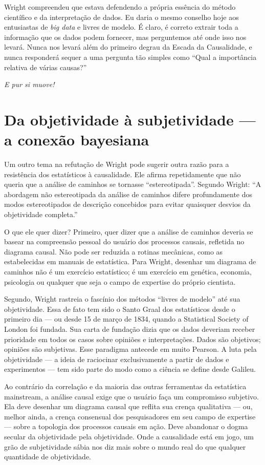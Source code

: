 \documentclass[11pt,a5paper,twoside]{book}
\begin{document}
Wright compreendeu que estava defendendo a própria essência do método científico e da interpretação de dados. Eu daria o mesmo conselho hoje aos entusiastas de \textit{big data} e livres de modelo. É claro, é correto extrair toda a informação que os dados podem fornecer, mas perguntemos até onde isso nos levará. Nunca nos levará além do primeiro degrau da Escada da Causalidade, e nunca responderá sequer a uma pergunta tão simples como “Qual a importância relativa de várias causas?”

\textit{E pur si muove!}

\section{Da objetividade à subjetividade — a conexão bayesiana}
Um outro tema na refutação de Wright pode sugerir outra razão para a resistência dos estatísticos à causalidade. Ele afirma repetidamente que não queria que a análise de caminhos se tornasse “estereotipada”. Segundo Wright: “A abordagem não estereotipada da análise de caminhos difere profundamente dos modos estereotipados de descrição concebidos para evitar quaisquer desvios da objetividade completa.”

O que ele quer dizer? Primeiro, quer dizer que a análise de caminhos deveria se basear na compreensão pessoal do usuário dos processos causais, refletida no diagrama causal. Não pode ser reduzida a rotinas mecânicas, como as estabelecidas em manuais de estatística. Para Wright, desenhar um diagrama de caminhos não é um exercício estatístico; é um exercício em genética, economia, psicologia ou qualquer que seja o campo de expertise do próprio cientista.

Segundo, Wright rastreia o fascínio dos métodos “livres de modelo” até sua objetividade. Essa de fato tem sido o Santo Graal dos estatísticos desde o primeiro dia — ou desde 15 de março de 1834, quando a Statistical Society of London foi fundada. Sua carta de fundação dizia que os dados deveriam receber prioridade em todos os casos sobre opiniões e interpretações. Dados são objetivos; opiniões são subjetivas. Esse paradigma antecede em muito Pearson. A luta pela objetividade — a ideia de raciocinar exclusivamente a partir de dados e experimentos — tem sido parte do modo como a ciência se define desde Galileu.

Ao contrário da correlação e da maioria das outras ferramentas da estatística mainstream, a análise causal exige que o usuário faça um compromisso subjetivo. Ela deve desenhar um diagrama causal que reflita sua crença qualitativa — ou, melhor ainda, a crença consensual dos pesquisadores em seu campo de expertise — sobre a topologia dos processos causais em ação. Deve abandonar o dogma secular da objetividade pela objetividade. Onde a causalidade está em jogo, um grão de subjetividade sábia nos diz mais sobre o mundo real do que qualquer quantidade de objetividade.
\end{document}
